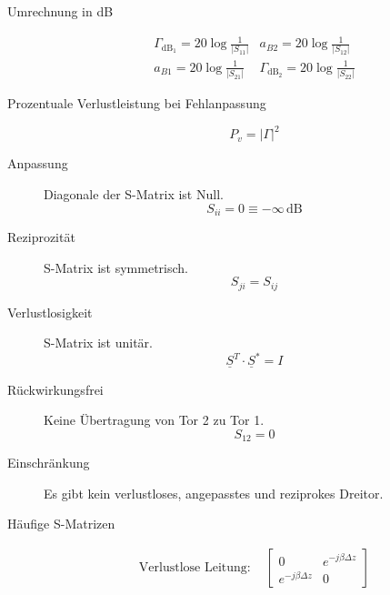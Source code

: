 \begin{description}
\item[Umrechnung in \si{\dB}]
\begin{equation*}
\begin{array}{cc}
\Gamma_{\si{\dB}_1} = 20\log\frac{1}{\vert S_{11} \vert}
& a_{B2} = 20\log\frac{1}{\vert S_{12} \vert}
 \\ 
a_{B1} = 20\log\frac{1}{\vert S_{21} \vert}
 & \Gamma_{\si{\dB}_2} = 20\log\frac{1}{\vert S_{22} \vert}
\end{array}
\end{equation*}

\item[Prozentuale Verlustleistung bei Fehlanpassung]
\begin{equation*}
P_v = |\Gamma|^2
\end{equation*}

\item[Anpassung] Diagonale der S-Matrix ist Null.
\begin{equation*}
S_{ii} = 0 \equiv -\infty\,\si{\dB}
\end{equation*}

\item[Reziprozität] S-Matrix ist symmetrisch.
\begin{equation*}
S_{ji} = S_{ij}
\end{equation*}

\item[Verlustlosigkeit] S-Matrix ist unitär.
\begin{equation*}
\underline{S}^T \cdot \underline{S}^* = I
\end{equation*}

\item[Rückwirkungsfrei] Keine Übertragung von Tor 2 zu Tor 1.
\begin{equation*}
S_{12} = 0
\end{equation*}

\item[Einschränkung] Es gibt kein verlustloses, angepasstes und reziprokes Dreitor.

\item[Häufige S-Matrizen] 
\begin{align*}
\text{Verlustlose Leitung: }& \left[ \begin{matrix}
0 & e^{-j\beta\Delta z} \\ 
e^{-j\beta\Delta z} & 0
\end{matrix} \right] \\
\end{align*}
\end{description}